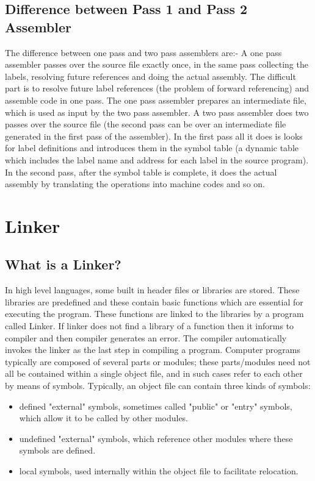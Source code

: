 \documentclass[a4paper,12pt]{extarticle}
\begin{document}
	\subsection{Difference between Pass 1 and Pass 2 Assembler}
The difference between one pass and two pass assemblers are:-\newline
A one pass assembler passes over the source file exactly once, in the same pass
collecting the labels, resolving future references and doing the actual assembly. The
difficult part is to resolve future label references (the problem of forward referencing)
and assemble code in one pass. The one pass assembler prepares an intermediate
file, which is used as input by the two pass assembler.\newline
A two pass assembler does two passes over the source file (the second pass can be
over an intermediate file generated in the first pass of the assembler). In the first
pass all it does is looks for label definitions and introduces them in the symbol table
(a dynamic table which includes the label name and address for each label in the
source program). In the second pass, after the symbol table is complete, it does the
actual assembly by translating the operations into machine codes and so on.
	\pagebreak
	\section{Linker}
	\subsection{What is a Linker?}
	In high level languages, some built in header files or libraries are stored. These
	libraries are predefined and these contain basic functions which are essential for executing
	the program. These functions are linked to the libraries by a program called
	Linker. If linker does not find a library of a function then it informs to compiler and
	then compiler generates an error. The compiler automatically invokes the linker as
	the last step in compiling a program.\newline
	Computer programs typically are composed of several parts or modules; these parts/modules
	need not all be contained within a single object file, and in such cases refer to each
	other by means of symbols. Typically, an object file can contain three kinds of
	symbols:
	\begin{itemize}
		\item defined "external" symbols, sometimes called "public" or "entry" symbols, which allow it to be called by other modules.
		\item undefined "external" symbols, which reference other modules where these symbols are defined.
		\item local symbols, used internally within the object file to facilitate relocation.
	\end{itemize}
\end{document}
